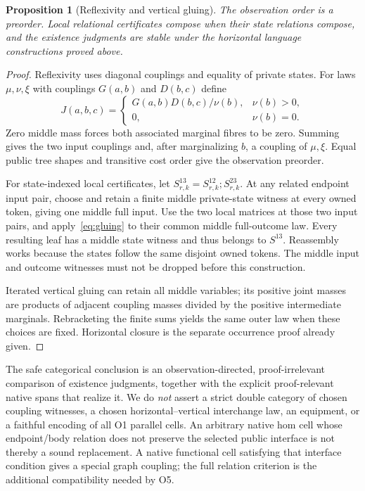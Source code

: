 \documentclass[11pt,a4paper]{article}
\newtheorem{proposition}[theorem]{Proposition}
\theoremstyle{definition}
\begin{document}
\begin{proposition}[Reflexivity and vertical gluing]\label{prop:vertical}
The observation order is a preorder. Local relational certificates
compose when their state relations compose, and the existence judgments
are stable under the horizontal language constructions proved above.
\end{proposition}
\begin{proof}
Reflexivity uses diagonal couplings and equality of private states.
For laws $\mu,\nu,\xi$ with couplings $G(a,b)$ and $D(b,c)$ define
\begin{equation}\label{eq:gluing}
 J(a,b,c)=
 \begin{cases}G(a,b)D(b,c)/\nu(b),&\nu(b)>0,\\0,&\nu(b)=0.
 \end{cases}
\end{equation}
Zero middle mass forces both associated marginal fibres to be zero.
Summing gives the two input couplings and, after marginalizing $b$, a
coupling of $\mu,\xi$. Equal public tree shapes and transitive cost
order give the observation preorder.

For state-indexed local certificates, let
$S^{13}_{r,k}=S^{12}_{r,k};S^{23}_{r,k}$. At any related endpoint input
pair, choose and retain a finite middle private-state witness at every
owned token, giving one middle full input. Use the two local matrices
at those two input pairs, and apply~\eqref{eq:gluing} to their common
middle full-outcome law. Every resulting leaf has a middle state witness
and thus belongs to $S^{13}$. Reassembly works because the states follow
the same disjoint owned tokens. The middle input and outcome witnesses
must not be dropped before this construction.

Iterated vertical gluing can retain all middle variables; its positive
joint masses are products of adjacent coupling masses divided by the
positive intermediate marginals. Rebracketing the finite sums yields
the same outer law when these choices are fixed. Horizontal closure is
the separate occurrence proof already given.
\end{proof}
The safe categorical conclusion is an observation-directed,
proof-irrelevant comparison of existence judgments, together with the
explicit proof-relevant native spans that realize it. We do \emph{not}
assert a strict double category of chosen coupling witnesses, a chosen
horizontal--vertical interchange law, an equipment, or a faithful
encoding of all O1 parallel cells. An arbitrary native hom cell whose
endpoint/body relation does not preserve the selected public interface
is not thereby a sound replacement. A native functional cell satisfying
that interface condition gives a special graph coupling; the full
relation criterion is the additional compatibility needed by O5.
\end{document}
